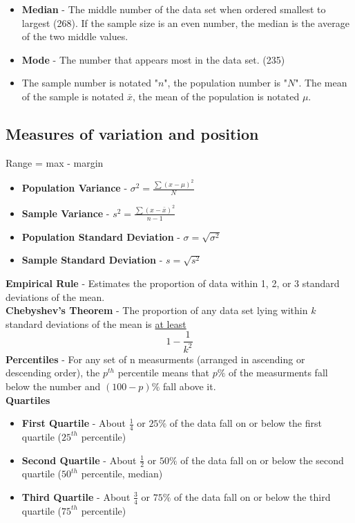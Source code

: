 \documentclass[a4paper]{article}
\let\bf\textbf
\begin{document}
\begin{itemize}
    \item \bf{Median} - The middle number of the data set when ordered smallest to largest (268). If the sample size is an even number, the median is the average of the two middle values.

    \item \bf{Mode} - The number that appears most in the data set. (235)

    \item The sample number is notated "$n$", the population number is "$N$". The mean of the sample is notated $\bar{x}$, the mean of the population is notated $\mu$.
\end{itemize}

\newpage
\subsection{Measures of variation and position}
Range = max - margin
\begin{itemize}
    \item \bf{Population Variance} - $\displaystyle\sigma^2 = \frac{\sum (x - \mu)^2}{N}$
    \item \bf{Sample Variance} - $\displaystyle s^2 = \frac{\sum (x - \bar{x})^2}{n - 1}$
    \item \bf{Population Standard Deviation} - $\displaystyle\sigma = \sqrt{\sigma^2}$
    \item \bf{Sample Standard Deviation} - $\displaystyle s = \sqrt{s^2}$
\end{itemize}
\bf{Empirical Rule} - Estimates the proportion of data within 1, 2, or 3 standard deviations of the mean.\\
\bf{Chebyshev's Theorem} - The proportion of any data set lying within $k$ standard deviations of the mean is \underline{at least} 
\begin{equation}
    1 - \frac{1}{k^2}
\end{equation}
\bf{Percentiles} - For any set of n measurments (arranged in ascending or descending order), the $p^{th}$ percentile means that $p\%$ of the measurments fall below the number and $(100 - p)\%$ fall above it.
\vspace{2mm}\\
\bf{Quartiles}
\begin{itemize}
    \item \bf{First Quartile} - About $\frac{1}{4}$ or $25\%$ of the data fall on or below the first quartile ($25^{th}$ percentile)
    \item \bf{Second Quartile} - About $\frac{1}{2}$ or $50\%$ of the data fall on or below the second quartile ($50^{th}$ percentile, median)
    \item \bf{Third Quartile} - About $\frac{3}{4}$ or $75\%$ of the data fall on or below the third quartile ($75^{th}$ percentile)
\end{itemize}
\end{document}
